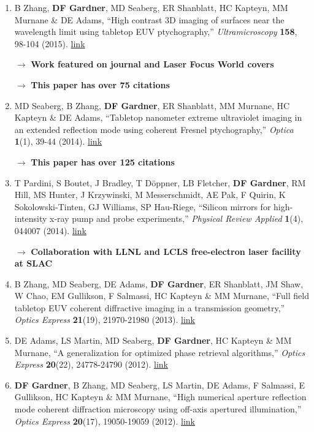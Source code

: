 \documentclass[letterpaper,12pt]{article}
\begin{document}
\begin{enumerate}[leftmargin=*]
	\item B Zhang, \textbf{DF Gardner}, MD Seaberg, ER Shanblatt, HC Kapteyn, MM Murnane \& DE Adams, ``High contrast 3D imaging of surfaces near the wavelength limit using tabletop EUV ptychography,'' \emph{Ultramicroscopy} \textbf{158}, 98-104 (2015). \href{https://doi.org/10.1016/j.ultramic.2015.07.006}{link}
	
	\quad $\rightarrow$ \textbf{Work featured on journal and Laser Focus World covers}
	
	\quad $\rightarrow$ \textbf{This paper has over 75 citations}
	
	\item  MD Seaberg, B Zhang, \textbf{DF Gardner}, ER Shanblatt, MM Murnane, HC Kapteyn \& DE Adams, ``Tabletop nanometer extreme ultraviolet imaging in an extended reflection mode using coherent Fresnel ptychography,''  \emph{Optica} \textbf{1}(1), 39-44 (2014). \href{https://doi.org/10.1364/OPTICA.1.000039}{link}
	
	\quad $\rightarrow$ \textbf{This paper has over 125 citations}
	
	\item T Pardini, S Boutet, J Bradley, T Döppner, LB Fletcher, \textbf{DF Gardner}, RM Hill, MS Hunter, J Krzywinski, M Messerschmidt, AE Pak, F Quirin, K Sokolowski-Tinten, GJ Williams, SP Hau-Riege, ``Silicon mirrors for high-intensity x-ray pump and probe experiments,''  \emph{Physical Review Applied} \textbf{1}(4), 044007 (2014). \href{https://doi.org/10.1103/PhysRevApplied.1.044007}{link}
	
	\quad $\rightarrow$ \textbf{Collaboration with LLNL and LCLS free-electron laser facility at SLAC}
	
	\item B Zhang, MD Seaberg, DE Adams, \textbf{DF Gardner}, ER Shanblatt, JM Shaw, W Chao, EM Gullikson, F Salmassi, HC Kapteyn \& MM Murnane, ``Full field tabletop EUV coherent diffractive imaging in a transmission geometry,'' \emph{Optics Express} \textbf{21}(19), 21970-21980 (2013). \href{https://doi.org/10.1364/OE.21.021970}{link}
	
	\item  DE Adams, LS Martin, MD Seaberg, \textbf{DF Gardner}, HC Kapteyn \& MM Murnane, ``A generalization for optimized phase retrieval algorithms,'' \emph{Optics Express} \textbf{20}(22), 24778-24790 (2012). \href{https://doi.org/10.1364/OE.20.024778}{link}
	
	\item \textbf{DF Gardner}, B Zhang, MD Seaberg, LS Martin, DE Adams, F Salmassi, E Gullikson, HC Kapteyn \& MM Murnane, ``High numerical aperture reflection mode coherent diffraction microscopy using off-axis apertured illumination,'' \emph{Optics Express} \textbf{20}(17), 19050-19059 (2012). \href{https://doi.org/10.1364/OE.20.019050}{link}
	

\end{enumerate}
\end{document}
